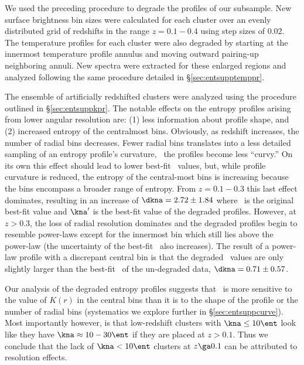We used the preceding procedure to degrade the profiles of our
subsample. New surface brightness bin sizes were calculated for each
cluster over an evenly distributed grid of redshifts in the range $z =
0.1-0.4$ using step sizes of 0.02. The temperature profiles for each
cluster were also degraded by starting at the innermost temperature
profile annulus and moving outward pairing-up neighboring annuli. New
spectra were extracted for these enlarged regions and analyzed
following the same procedure detailed in \S\ref{sec:entsupptemppr}.

The ensemble of artificially redshifted clusters were analyzed using
the procedure outlined in \S\ref{sec:entsuppkpr}. The notable effects on the
entropy profiles arising from lower angular resolution are: (1) less
information about profile shape, and (2) increased entropy of the
centralmost bins. Obviously, as redshift increases, the number of
radial bins decreases. Fewer radial bins translates into a less
detailed sampling of an entropy profile's curvature, \eg\ the profiles
become less ``curvy.'' On its own this effect should lead to lower
best-fit \kna\ values, but, while profile curvature is reduced, the
entropy of the central-most bins is increasing because the bins
encompass a broader range of entropy. From $z = 0.1-0.3$ this last
effect dominates, resulting in an increase of $\dkna = 2.72 \pm 1.84$
where \kna\ is the original best-fit value and $\kna^{\prime}$ is the
best-fit value of the degraded profiles. However, at $z > 0.3$, the
loss of radial resolution dominates and the degraded profiles begin to
resemble power-laws except for the innermost bin which still lies
above the power-law (the uncertainty of the best-fit
\kna\ also increases). The result of a power-law profile with a
discrepant central bin is that the degraded \kna\ values are only
slightly larger than the best-fit \kna\ of the un-degraded data,
$\dkna = 0.71 \pm 0.57$.

Our analysis of the degraded entropy profiles suggests that \kna\ is
more sensitive to the value of $K(r)$ in the central bins than it is
to the shape of the profile or the number of radial bins (systematics
we explore further in \S\ref{sec:entsuppcurve}). Most importantly however, is
that low-redshift clusters with $\kna \le 10 \ent$ look like they have
$\kna \approx 10-30 \ent$ if they are placed at $z > 0.1$. Thus we
conclude that the lack of $\kna < 10 \ent$ clusters at $z \ga 0.1$ can
be attributed to resolution effects.

